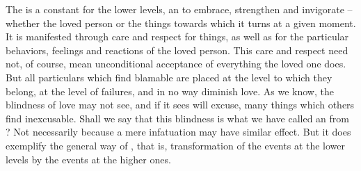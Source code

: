 The  is a constant  for the lower levels, an
 to embrace, strengthen and invigorate -- whether the loved
person or the things towards which it turns at a given moment.  It is manifested
through care and respect for things, as well as for the particular behaviors,
feelings and reactions of the loved person. This care and respect need not, of course, mean
unconditional acceptance of everything the loved one does.  But all particulars
which  find blamable are placed at the level to which they belong, at the
level of  failures, and in no way diminish  love.  As we know,
the blindness of love may not see, and if it sees will excuse, many things which
others find inexcusable.  Shall we say that this blindness is what we have
called an  from ? Not necessarily because a mere
infatuation may have similar effect. But it does exemplify the general way of
, that is, transformation of the events at the lower
levels by the  events at the higher ones.

